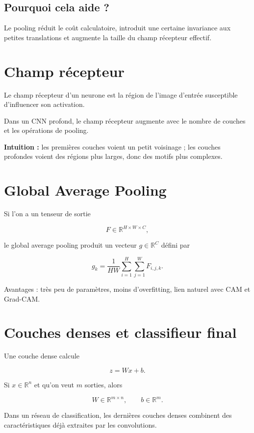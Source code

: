 \documentclass[11pt,a4paper]{article}
\begin{document}
\subsection{Pourquoi cela aide ?}

Le pooling réduit le coût calculatoire, introduit une certaine invariance aux petites translations et augmente la taille du champ récepteur effectif.

\section{Champ récepteur}

Le champ récepteur d'un neurone est la région de l'image d'entrée susceptible d'influencer son activation.

Dans un CNN profond, le champ récepteur augmente avec le nombre de couches et les opérations de pooling.

\textbf{Intuition :} les premières couches voient un petit voisinage ; les couches profondes voient des régions plus larges, donc des motifs plus complexes.

\section{Global Average Pooling}

Si l'on a un tenseur de sortie

\[
F \in \mathbb{R}^{H \times W \times C},
\]

le global average pooling produit un vecteur $g \in \mathbb{R}^C$ défini par

\[
g_k = \frac{1}{HW}\sum_{i=1}^{H}\sum_{j=1}^{W} F_{i,j,k}.
\]

Avantages : très peu de paramètres, moins d'overfitting, lien naturel avec CAM et Grad-CAM.

\section{Couches denses et classifieur final}

Une couche dense calcule

\[
z = Wx + b.
\]

Si $x \in \mathbb{R}^n$ et qu'on veut $m$ sorties, alors

\[
W \in \mathbb{R}^{m \times n}, \qquad b \in \mathbb{R}^m.
\]

Dans un réseau de classification, les dernières couches denses combinent des caractéristiques déjà extraites par les convolutions.
\end{document}
